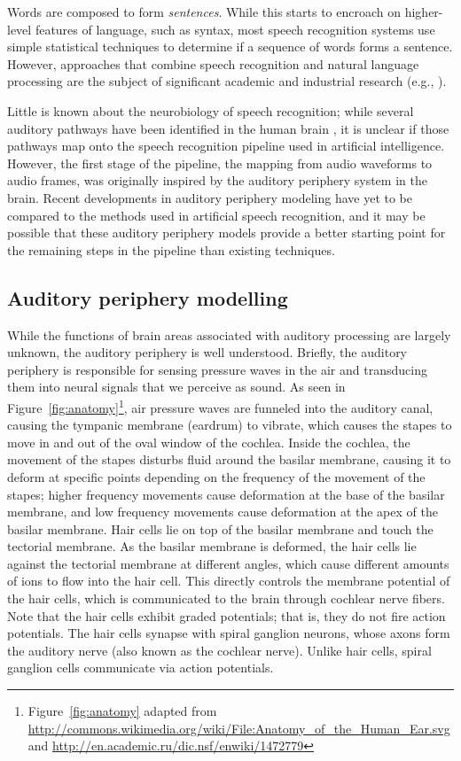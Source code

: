 \documentclass{article}
\begin{document}
Words are composed to form \textit{sentences}.
While this starts to encroach
on higher-level features of language,
such as syntax,
most speech recognition systems
use simple statistical techniques
to determine if a sequence of words
forms a sentence.
However, approaches that combine
speech recognition and natural language processing
are the subject of significant
academic and industrial research
(e.g., \citealp{sagae2009}).

Little is known about the neurobiology
of speech recognition;
while several auditory pathways have been identified
in the human brain \citep{scott2003},
it is unclear if those pathways map onto
the speech recognition pipeline
used in artificial intelligence.
However, the first stage of the pipeline,
the mapping from audio waveforms
to audio frames, was originally inspired
by the auditory periphery system
in the brain.
Recent developments in auditory periphery modeling
have yet to be compared to the methods used
in artificial speech recognition,
and it may be possible that
these auditory periphery models
provide a better starting point
for the remaining steps in the pipeline
than existing techniques.

\subsection{Auditory periphery modelling}
\label{subsec:periphery}

While the functions of brain areas
associated with auditory processing
are largely unknown,
the auditory periphery is well understood.
Briefly, the auditory periphery
is responsible for sensing pressure waves
in the air and transducing them into
neural signals that we perceive as sound.
As seen in Figure~\ref{fig:anatomy}\footnote{Figure~\ref{fig:anatomy}
  adapted from
  \url{http://commons.wikimedia.org/wiki/File:Anatomy_of_the_Human_Ear.svg}
  and \url{http://en.academic.ru/dic.nsf/enwiki/1472779}},
air pressure waves are funneled into the auditory canal,
causing the tympanic membrane (eardrum)
to vibrate, which causes the stapes
to move in and out of the oval window of the cochlea.
Inside the cochlea, the movement of the stapes
disturbs fluid around the basilar membrane,
causing it to deform at specific points
depending on the frequency of the movement
of the stapes; higher frequency movements
cause deformation at the base of the basilar membrane,
and low frequency movements cause deformation
at the apex of the basilar membrane.
Hair cells lie on top of the basilar membrane
and touch the tectorial membrane.
As the basilar membrane is deformed,
the hair cells lie against
the tectorial membrane at different angles,
which cause different amounts of ions
to flow into the hair cell.
This directly controls the membrane potential
of the hair cells,
which is communicated
to the brain through cochlear nerve fibers.
Note that the hair cells exhibit graded potentials;
that is, they do not fire action potentials.
The hair cells synapse with spiral ganglion neurons,
whose axons form the auditory nerve
(also known as the cochlear nerve).
Unlike hair cells, spiral ganglion cells
communicate via action potentials.
\end{document}
